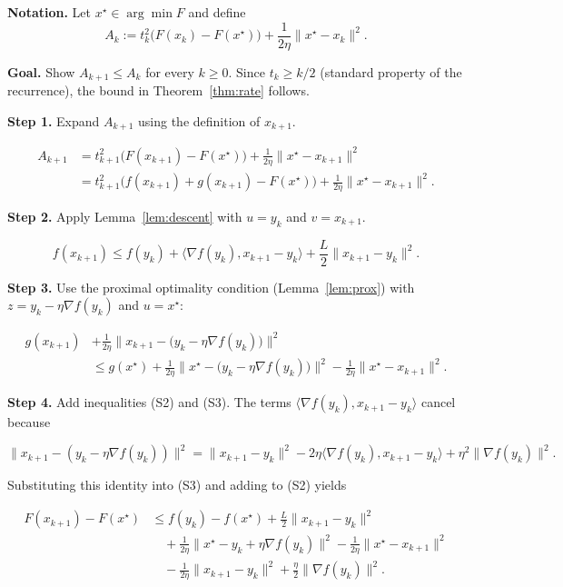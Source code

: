 \documentclass{article}
\begin{document}
\noindent\textbf{Notation.} Let $x^\star\in\arg\min F$ and define
\[
A_k:=t_k^{2}\bigl(F(x_k)-F(x^\star)\bigr)+\frac{1}{2\eta}\|x^\star-x_k\|^{2}. \tag{P1}
\]

\noindent\textbf{Goal.} Show $A_{k+1}\le A_k$ for every $k\ge0$.  
Since $t_k\ge k/2$ (standard property of the recurrence), the bound in Theorem~\ref{thm:rate} follows.

\bigskip
\noindent\textbf{Step 1.} Expand $A_{k+1}$ using the definition of $x_{k+1}$.

\[
\begin{aligned}
A_{k+1}
&=t_{k+1}^{2}\bigl(F(x_{k+1})-F(x^\star)\bigr)+\frac{1}{2\eta}\|x^\star-x_{k+1}\|^{2}\\
&=t_{k+1}^{2}\bigl(f(x_{k+1})+g(x_{k+1})-F(x^\star)\bigr)
   +\frac{1}{2\eta}\|x^\star-x_{k+1}\|^{2}. \tag{S1}
\end{aligned}
\]

\noindent\textbf{Step 2.} Apply Lemma~\ref{lem:descent} with $u=y_k$ and $v=x_{k+1}$.

\[
f(x_{k+1})\le f(y_k)+\langle\nabla f(y_k),x_{k+1}-y_k\rangle+\frac{L}{2}\|x_{k+1}-y_k\|^{2}. \tag{S2}
\]

\noindent\textbf{Step 3.} Use the proximal optimality condition (Lemma~\ref{lem:prox}) with $z=y_k-\eta\nabla f(y_k)$ and $u=x^\star$:

\[
\begin{aligned}
g(x_{k+1}) &+\frac{1}{2\eta}\|x_{k+1}-\bigl(y_k-\eta\nabla f(y_k)\bigr)\|^{2}\\
&\le g(x^\star)+\frac{1}{2\eta}\|x^\star-\bigl(y_k-\eta\nabla f(y_k)\bigr)\|^{2}
-\frac{1}{2\eta}\|x^\star-x_{k+1}\|^{2}. \tag{S3}
\end{aligned}
\]

\noindent\textbf{Step 4.} Add inequalities (S2) and (S3).  The terms $\langle\nabla f(y_k),x_{k+1}-y_k\rangle$ cancel because  

\[
\|x_{k+1}-(y_k-\eta\nabla f(y_k))\|^{2}
=\|x_{k+1}-y_k\|^{2}-2\eta\langle\nabla f(y_k),x_{k+1}-y_k\rangle+\eta^{2}\|\nabla f(y_k)\|^{2}.
\]

Substituting this identity into (S3) and adding to (S2) yields

\[
\begin{aligned}
F(x_{k+1})-F(x^\star)
&\le f(y_k)-f(x^\star)+\frac{L}{2}\|x_{k+1}-y_k\|^{2}\\
&\quad+\frac{1}{2\eta}\|x^\star-y_k+\eta\nabla f(y_k)\|^{2}
      -\frac{1}{2\eta}\|x^\star-x_{k+1}\|^{2}\\
&\quad-\frac{1}{2\eta}\|x_{k+1}-y_k\|^{2}
      +\frac{\eta}{2}\|\nabla f(y_k)\|^{2}. \tag{S4}
\end{aligned}
\]
\end{document}

